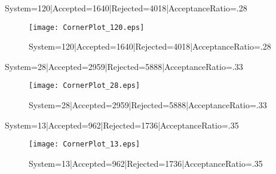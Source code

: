 \documentclass[10pt]{article}
\begin{document}
System=120|Accepted=1640|Rejected=4018|AcceptanceRatio=.28
\begin{figure}[h]
\texttt{[image: CornerPlot\_120.eps]}
\caption{System=120|Accepted=1640|Rejected=4018|AcceptanceRatio=.28}
\label{S120}
\centering
\end{figure}

System=28|Accepted=2959|Rejected=5888|AcceptanceRatio=.33
\begin{figure}[h]
\texttt{[image: CornerPlot\_28.eps]}
\caption{System=28|Accepted=2959|Rejected=5888|AcceptanceRatio=.33}
\label{S28}
\centering
\end{figure}

System=13|Accepted=962|Rejected=1736|AcceptanceRatio=.35
\begin{figure}[h]
\texttt{[image: CornerPlot\_13.eps]}
\caption{System=13|Accepted=962|Rejected=1736|AcceptanceRatio=.35}
\label{S13}
\centering
\end{figure}
\end{document}
